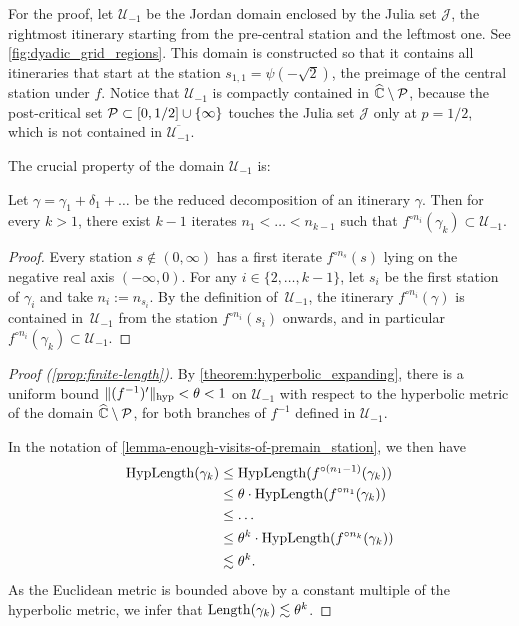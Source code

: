 

For the proof, let $\mathcal U_{-1}$ be the Jordan domain enclosed by the Julia set $\mathcal J$, 
the rightmost itinerary starting from the pre-central station and the leftmost one. 
See \cref{fig:dyadic_grid_regions}.
This domain is constructed so that it contains all itineraries that start at the station 
$s_{1,1} = \psi(-\sqrt{2})$, the preimage of the central station under $f$. 
Notice that $\mathcal U_{-1}$ is compactly contained in $\widehat{\mathbb C} \setminus \operatorname{\mathcal P}$, because the post-critical set $\operatorname{\mathcal P} \subset [0,1/2] \cup \{\infty\}$ touches the Julia set $\mathcal J$ only at $p=1/2$, which is not contained in $\overline{\mathcal U_{-1}}$.

The crucial property of the domain $\mathcal U_{-1}$ is: 

\begin{lemma} \label{lemma-enough-visits-of-premain_station}
	Let $\gamma = \gamma_1 + \delta_1 + \dots $ be the reduced decomposition of an itinerary $\gamma$. Then for every $k > 1$, there exist $k-1$ iterates $n_1 < \dots < n_{k-1}$ such that $f^{\circ {n_i}}(\gamma_k) \subset \mathcal U_{-1}$. %
\end{lemma}

\begin{proof}
	Every station $s \not \in (0, \infty)$ has a first iterate $f^{\circ n_s}(s)$ lying on the negative real axis $(-\infty, 0)$.
	For any $i \in \{2, \dots, k-1\}$, let $s_i$ be the first station of $\gamma _i$ and take $n_i := n_{s_i}$. %
	By the definition of $\,\mathcal U_{-1}$, the itinerary $f^{\circ n_i}(\gamma)$ is contained in  $\,\mathcal U_{-1}$ from the station $f^{\circ n_i}(s_i)$ onwards, and in particular $f^{\circ n_i}(\gamma_k) \subset \mathcal U_{-1}$.
\end{proof}
\begin{proof}[Proof (\cref{prop:finite-length})] 
By \cref{theorem:hyperbolic_expanding}, there is a uniform bound $\Vert (f^{-1})' \Vert_{\operatorname{hyp}}< \theta < 1$ on $\mathcal U_{-1}$
with respect to the hyperbolic metric of the domain $\widehat{\mathbb C} \setminus \operatorname{\mathcal P}$, for both branches of $f^{-1}$ defined in $\mathcal U_{-1}$. 

In the notation of \cref{lemma-enough-visits-of-premain_station}, we then have 
\begin{align*}
	\operatorname{HypLength}(\gamma_k)  &  \leq \operatorname{HypLength}(f^{\circ (n_1-1)}(\gamma_k)) \\ 
	& \leq \theta \cdot \operatorname{HypLength}(f^{\circ n_1}(\gamma_k))\\
	& \leq  \dots \\
	 & \leq \theta^k \cdot \operatorname{HypLength}(f^{\circ n_k}(\gamma_k)) \\
	 & \lesssim \theta^k.
\end{align*}
As the Euclidean metric is bounded above by a constant multiple of the hyperbolic metric, we infer that $\operatorname{Length}(\gamma_k) \lesssim \theta^k$.
\end{proof}


